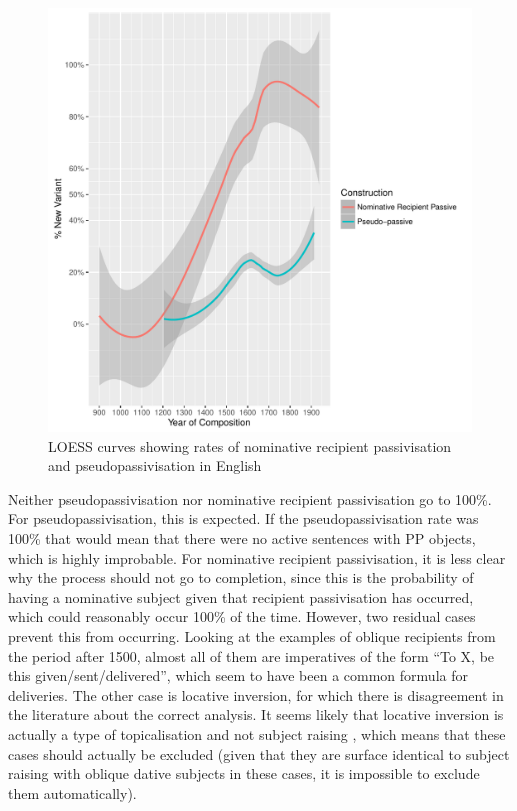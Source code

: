 	\begin{figure}[ht!]
		\includegraphics[width=\linewidth]{../images/recpas-pseudo}
		\caption{LOESS curves showing rates of nominative recipient passivisation and pseudopassivisation in English}
		\label{fig:recpas-pseudo}
	\end{figure}

	Neither pseudopassivisation nor nominative recipient passivisation go to 100\%. For pseudopassivisation, this is expected. If the pseudopassivisation rate was 100\% that would mean that there were no active sentences with PP objects, which is highly improbable. For nominative recipient passivisation, it is less clear why the process should not go to completion, since this is the probability of having a nominative subject given that recipient passivisation has occurred, which could reasonably occur 100\% of the time. However, two residual cases prevent this from occurring. Looking at the examples of oblique recipients from the period after 1500, almost all of them are imperatives of the form ``To X, be this given/sent/delivered'', which seem to have been a common formula for deliveries. The other case is locative inversion, for which there is disagreement in the literature about the correct analysis. It seems likely that locative inversion is actually a type of topicalisation and not subject raising \citep{Bresnan.1994}, which means that these cases should actually be excluded (given that they are surface identical to subject raising with oblique dative subjects in these cases, it is impossible to exclude them automatically).

